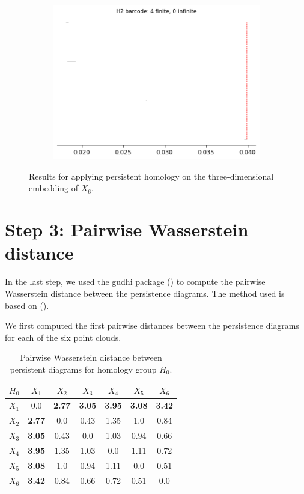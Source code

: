 \begin{figure}[H]
\begin{subfigure}[b]{0.24\textwidth}
\includegraphics[width=\textwidth]{figures/X6_H2_barcode.png}
 \caption{}
\end{subfigure}
\caption{Results for applying persistent homology on the three-dimensional embedding of $X_6$.}
\end{figure}

\section{Step 3: Pairwise Wasserstein distance}
In the last step, we used the gudhi package (\cite{gudhi:urm}) to compute the pairwise Wasserstein distance between the persistence diagrams. The method used is based on (\cite{kerber_geometry_2016}). 

We first computed the first pairwise distances between the persistence diagrams for each of the six point clouds. 

\begin{table}[!htbp]
        \centering
        \small
        \setlength\tabcolsep{5pt}
        \begin{tabular}{|c|c|c|c|c|c|c|}
\hline
 $H_0$& $X_1$ & $X_2$ & $X_3$ & $X_4$ & $X_5$ & $X_6$\\
 \hline
$X_1$ &
0.0&
\textbf{2.77}&
\textbf{3.05}&
\textbf{3.95}&
\textbf{3.08}&
\textbf{3.42}
\\
\hline
$X_2$ &
\textbf{2.77}&
0.0&
0.43&
1.35&
1.0&
0.84
\\
\hline
$X_3$ &
\textbf{3.05}&
0.43&
0.0&
1.03&
0.94&
0.66
\\
\hline
$X_4$ &
\textbf{3.95}&
1.35&
1.03&
0.0&
1.11&
0.72
\\
\hline
$X_5$ &
\textbf{3.08}&
1.0&
0.94&
1.11&
0.0&
0.51
\\
\hline
$X_6$ &
\textbf{3.42}&
0.84&
0.66&
0.72&
0.51&
0.0
\\
\hline
\end{tabular}
\caption{Pairwise Wasserstein distance between persistent diagrams for homology group $H_0$.}
\label{tab:Wass_H0}
\end{table}

